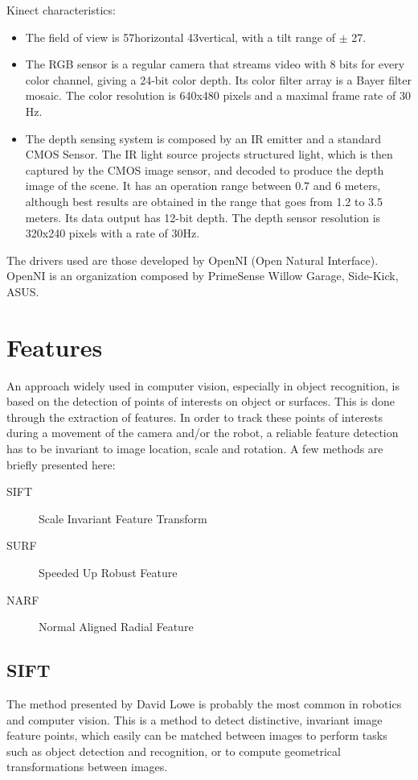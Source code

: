 Kinect characteristics:
\begin{itemize}
\item The field of view is 57\textdegree horizontal 43\textdegree vertical, with a tilt range of $\pm$ 27\textdegree.
\item The RGB sensor is a regular camera that streams video with 8 bits for every color channel, giving a 24-bit color depth. Its color filter array is a Bayer filter mosaic. The color resolution is 640x480 pixels and a maximal frame rate of 30 Hz.
\item The depth sensing system is composed by an IR emitter and a standard CMOS Sensor. The IR light source projects structured light, which is then captured by the CMOS image sensor, and decoded to produce the depth image of the scene. It has an operation range between 0.7 and 6 meters, although best results are obtained in the range that goes from 1.2 to 3.5 meters. Its data output has 12-bit depth. The depth sensor resolution is 320x240 pixels with a rate of 30Hz.
\end{itemize}

The drivers used are those developed by OpenNI (Open Natural Interface). OpenNI is an organization composed by PrimeSense Willow Garage, Side-Kick, ASUS.


\section{Features}

An approach widely used in computer vision, especially in object recognition, is based on the detection of points of interests on object or surfaces. This is done through the extraction of features. In order to track these points of interests during a movement of the camera and/or the robot, a reliable feature detection has to be invariant to image location, scale and rotation. A few methods are briefly presented here:
\begin{description}
\item[SIFT] Scale Invariant Feature Transform
\item[SURF] Speeded Up Robust Feature
\item[NARF] Normal Aligned Radial Feature
\end{description}

\subsection{SIFT}
The method presented by David Lowe \cite{lowe_2004_sift} is probably the most common in robotics and computer vision.
This is a method to detect distinctive, invariant image feature points, which easily can be matched between images to perform tasks such as object detection and recognition, or to compute geometrical transformations between images.

